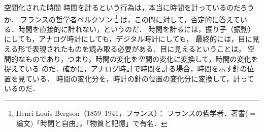             \begin{memo}{空間化された時間}
                時間を計るという行為は，本当に時間を計っているのだろうか．
                フランスの哲学者ベルクソン
                    \footnote{
                        Henri-Louis Bergson（1859--1941，フランス）：
                        フランスの哲学者．著書($=$論文)「時間と自由」，「物質と記憶」で有名．
                    }
                は，この問に対して，否定的に答えている．時間を直接的に計れない，というのだ．
                時間を計るには，振り子（振動）にしても，アナログ時計にしても，デジタル時計にしても，
                最終的には，目に見える形で表現されたものを読み取る必要がある．目に見えるということは，
                空間的なものであり，つまり，時間の変化を空間の変化に変換して，時間の変化を捉えている
                のだ．確かに，アナログ時計で時間を計る場合，時間を示す針の位置を見ている．
                時間の変化分を，時計の針の位置の変化分に変換して，計っているのだ．
            \end{memo}

